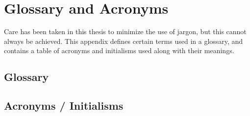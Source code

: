 \chapter{Glossary and Acronyms}
\label{app_glossary}

Care has been taken in this thesis to minimize the use of jargon, but this cannot always be achieved.  This appendix defines certain terms used in a glossary, and contains a table of acronyms and initialisms used along with their meanings.

\section{Glossary}
\label{sec_glossary}

% 
% 


\section{Acronyms / Initialisms}
\label{sec:acronym}



